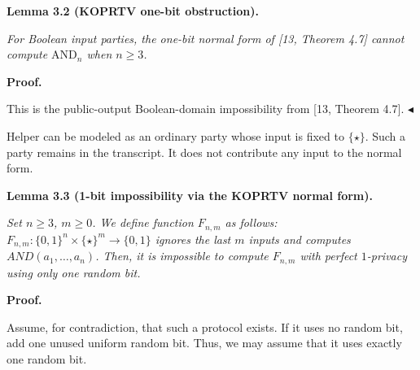 

\par\medskip\noindent\textbf{
\textbf{Lemma 3.2}\textbf{ }(KOPRTV one-bit obstruction)\textbf{.}
}\par



\emph{For Boolean input parties, the one-bit normal form of [13, Theorem 4.7] cannot compute $\mathrm{AND}_{n}$ when $n\geq 3$.}\par






\par\medskip\noindent\textbf{Proof.}\par




This is the public-output Boolean-domain impossibility from [13, Theorem 4.7].
$\blacktriangleleft$\par




Helper can be modeled as an ordinary party whose input is fixed to $\{\star\}$. Such a party remains in the transcript. It does not contribute any input to the normal form.\par





\par\medskip\noindent\textbf{
\textbf{Lemma 3.3}\textbf{ }(1-bit impossibility via the KOPRTV normal form)\textbf{.}
}\par



\emph{Set $n\geq 3$, $m\geq 0$. We define function $F_{n,m}$ as follows:
$F_{n,m}:\{0,1\}^{n}\times\{\star\}^{m}\to\{0,1\}$ ignores
the last $m$ inputs and computes $AND(a_{1},\ldots,a_{n})$.
Then, it is impossible to compute $F_{n,m}$ with perfect $1$-privacy using
only one random bit.}\par







\par\medskip\noindent\textbf{Proof.}\par




Assume, for contradiction, that such a protocol exists. If it uses no random
bit, add one unused uniform random bit. Thus, we may assume that it uses exactly
one random bit.\par




